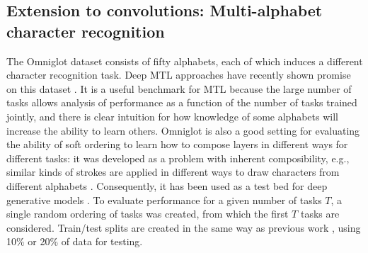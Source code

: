\documentclass{article}
\theoremstyle{definition}
\theoremstyle{remark}
\begin{document}
\subsection{Extension to convolutions: Multi-alphabet character recognition} \label{subsec:omniglot}

The Omniglot dataset \citep{Lake:2015} consists of fifty alphabets, each of which induces a different character recognition task.
Deep MTL approaches have recently shown promise on this dataset \citep{Yang:2017}. It is a useful benchmark for MTL because the large number of tasks allows analysis of performance as a function of the number of tasks trained jointly, and there is clear intuition for how knowledge of some alphabets will increase the ability to learn others.
Omniglot is also a good setting for evaluating the ability of soft ordering to learn how to compose layers in different ways for different tasks: it was developed as a problem with inherent composibility, e.g., similar kinds of strokes are applied in different ways to draw characters from different alphabets \citep{Lake:2015}. Consequently, it has been used as a test bed for deep generative models \citep{Rezende:2016}. 
To evaluate performance for a given number of tasks $T$, a single random ordering of tasks was created, from which the first $T$ tasks are considered.
Train/test splits are created in the same way as previous work  \citep{Yang:2017}, using 10\% or 20\% of data for testing.
\end{document}
